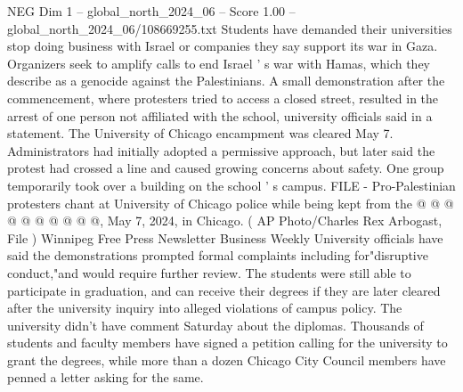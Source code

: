 \begin{textsample}{NEG Dim 1 – global\_north\_2024\_06 – Score 1.00 – global\_north\_2024\_06/108669255.txt}
Students have demanded their universities stop doing business with Israel or companies they say support its war in Gaza.
Organizers seek to amplify calls to end Israel ' s war with Hamas, which they describe as a genocide against the Palestinians.
A small demonstration after the commencement, where protesters tried to access a closed street, resulted in the arrest of one person not affiliated with the school, university officials said in a statement.
The University of Chicago encampment was cleared May 7.
Administrators had initially adopted a permissive approach, but later said the protest had crossed a line and caused growing concerns about safety.
One group temporarily took over a building on the school ' s campus.
FILE - Pro-Palestinian protesters chant at University of Chicago police while being kept from the @ @ @ @ @ @ @ @ @ @, May 7, 2024, in Chicago. ( AP Photo/Charles Rex Arbogast, File ) Winnipeg Free Press Newsletter Business Weekly University officials have said the demonstrations prompted formal complaints including for"disruptive conduct,"and would require further review.
The students were still able to participate in graduation, and can receive their degrees if they are later cleared after the university inquiry into alleged violations of campus policy.
The university didn't have comment Saturday about the diplomas.
Thousands of students and faculty members have signed a petition calling for the university to grant the degrees, while more than a dozen Chicago City Council members have penned a letter asking for the same.

\end{textsample}

